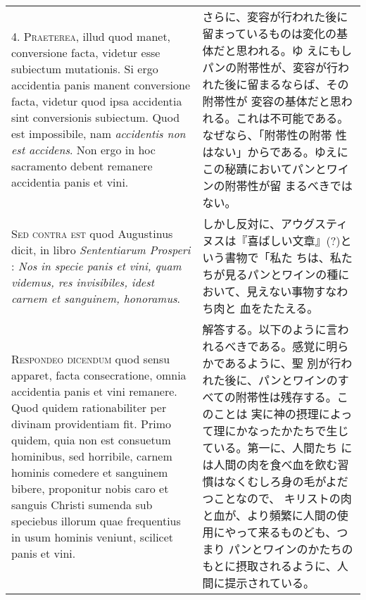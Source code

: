 \documentclass[10pt]{jsarticle} %
\begin{document}
\begin{longtable}{p{21em}p{21em}}
\\



4. {\scshape Praeterea}, illud quod manet, conversione facta, videtur esse subiectum
mutationis. Si ergo accidentia panis manent conversione facta, videtur
quod ipsa accidentia sint conversionis subiectum. Quod est
impossibile, nam {\itshape accidentis non est accidens}. Non ergo in hoc
sacramento debent remanere accidentia panis et vini.

&

さらに、変容が行われた後に留まっているものは変化の基体だと思われる。ゆ
 えにもしパンの附帯性が、変容が行われた後に留まるならば、その附帯性が
 変容の基体だと思われる。これは不可能である。なぜなら、「附帯性の附帯
 性はない」からである。ゆえにこの秘蹟においてパンとワインの附帯性が留
 まるべきではない。



\\



{\scshape Sed contra est} quod Augustinus dicit, in libro {\itshape
 Sententiarum Prosperi} :
{\itshape Nos in specie panis et vini, quam videmus, res invisibiles, idest
carnem et sanguinem, honoramus}.

&

しかし反対に、アウグスティヌスは『喜ばしい文章』(?)という書物で「私た
 ちは、私たちが見るパンとワインの種において、見えない事物すなわち肉と
 血をたたえる。

\\



{\scshape Respondeo dicendum} quod sensu apparet, facta consecratione, omnia
accidentia panis et vini remanere. Quod quidem rationabiliter per
divinam providentiam fit. Primo quidem, quia non est consuetum
hominibus, sed horribile, carnem hominis comedere et sanguinem bibere,
proponitur nobis caro et sanguis Christi sumenda sub speciebus illorum
quae frequentius in usum hominis veniunt, scilicet panis et
vini. 


&

解答する。以下のように言われるべきである。感覚に明らかであるように、聖
 別が行われた後に、パンとワインのすべての附帯性は残存する。このことは
 実に神の摂理によって理にかなったかたちで生じている。第一に、人間たち
 には人間の肉を食べ血を飲む習慣はなくむしろ身の毛がよだつことなので、
 キリストの肉と血が、より頻繁に人間の使用にやって来るものども、つまり
 パンとワインのかたちのもとに摂取されるように、人間に提示されている。


\end{longtable}
\end{document}
